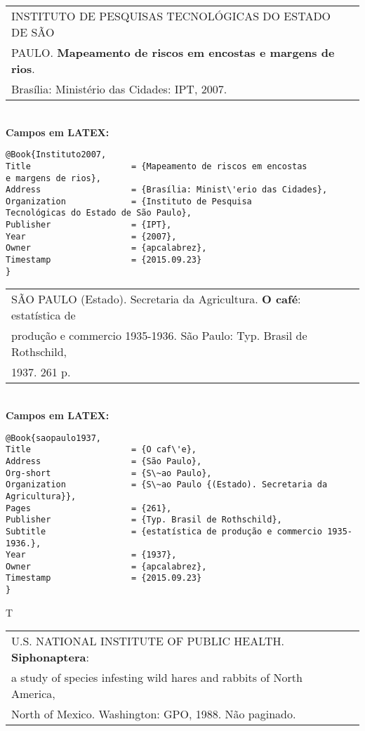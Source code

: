 \begin{tabular}{|l|c|} \hline
	INSTITUTO DE PESQUISAS TECNOLÓGICAS DO ESTADO DE SÃO \\
	PAULO.  \textbf{Mapeamento de riscos em encostas e margens de rios}. \\ 
	Brasília: Minist\'erio das Cidades: IPT, 2007.   \\\hline
\end{tabular}\\

\textbf{Campos em LATEX:}

\begin{verbatim}
@Book{Instituto2007,
Title                    = {Mapeamento de riscos em encostas
e margens de rios},
Address                  = {Brasília: Minist\'erio das Cidades},
Organization             = {Instituto de Pesquisa
Tecnológicas do Estado de São Paulo},
Publisher                = {IPT},
Year                     = {2007},
Owner                    = {apcalabrez},
Timestamp                = {2015.09.23}
}
\end{verbatim}

\begin{tabular}{|l|c|} \hline
	SÃO PAULO (Estado). Secretaria da Agricultura. \textbf{O caf\'e}: estatística de \\produção e commercio 1935-1936. São Paulo: Typ. Brasil de Rothschild, \\1937. 261 p.  \\\hline
\end{tabular}\\

\textbf{Campos em LATEX:}

\begin{verbatim}
@Book{saopaulo1937,
Title                    = {O caf\'e},
Address                  = {São Paulo},
Org-short                = {S\~ao Paulo},
Organization             = {S\~ao Paulo {(Estado). Secretaria da 
Agricultura}},
Pages                    = {261},
Publisher                = {Typ. Brasil de Rothschild},
Subtitle                 = {estatística de produção e commercio 1935-
1936.},
Year                     = {1937},
Owner                    = {apcalabrez},
Timestamp                = {2015.09.23}
}
\end{verbatim}
T

\begin{tabular}{|l|c|} \hline
	U.S. NATIONAL INSTITUTE OF PUBLIC HEALTH. \textbf{Siphonaptera}: \\  a study
	of species infesting wild hares and rabbits of North America,\\ North of Mexico. Washington: GPO, 1988. Não paginado.  \\\hline
\end{tabular}\\

